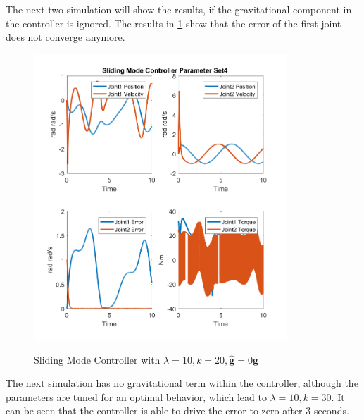 The next two simulation will show the results, if the gravitational component in the controller is ignored. The results in \ref{fig:ch5_smo4}  show that the error of the first joint does not converge anymore.
\begin{figure}[]
	\centering
	\includegraphics[width=0.85\textwidth]{pics/SlidingModeControllerParameterSet4.png}\\
	\caption{Sliding Mode Controller with $\lambda = 10, k=20,\hat{\mathbf{g}}=0\mathbf{g}$  }
	\label{fig:ch5_smo4}
\end{figure}

The next simulation has no gravitational term within the controller, although the parameters are tuned for an optimal behavior, which lead to $\lambda = 10, k=30 $. It can be seen that the controller is able to drive the error to zero after 3 seconds.

